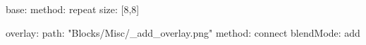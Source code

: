 base:
  method: repeat
  size: [8,8]

overlay:
  path: "Blocks/Misc/_add_overlay.png"
  method: connect
  blendMode: add